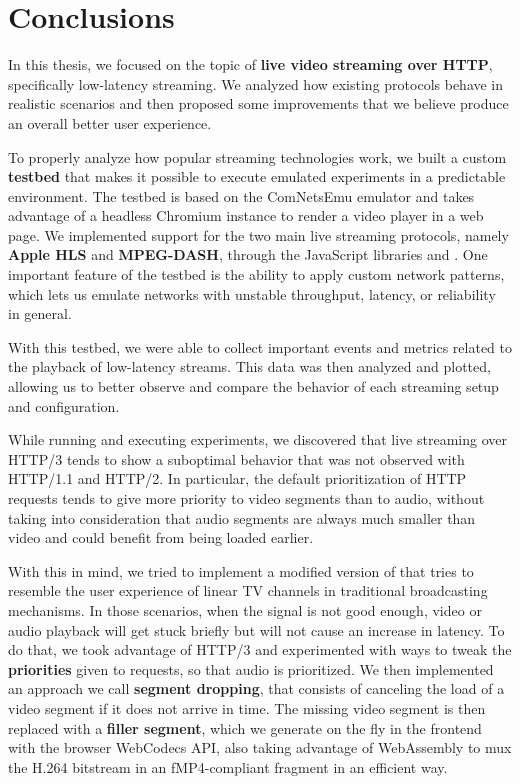 \chapter{Conclusions}
\label{cha:conclusions}

In this thesis, we focused on the topic of \textbf{live video streaming over HTTP}, specifically low-latency streaming. We analyzed how existing protocols behave in realistic scenarios and then proposed some improvements that we believe produce an overall better user experience.

To properly analyze how popular streaming technologies work, we built a custom \textbf{testbed} that makes it possible to execute emulated experiments in a predictable environment. The testbed is based on the ComNetsEmu emulator and takes advantage of a headless Chromium instance to render a video player in a web page. We implemented support for the two main live streaming protocols, namely \textbf{Apple HLS} and \textbf{MPEG-DASH}, through the JavaScript libraries \hlsjs{} and \dashjs{}. One important feature of the testbed is the ability to apply custom network patterns, which lets us emulate networks with unstable throughput, latency, or reliability in general.

With this testbed, we were able to collect important events and metrics related to the playback of low-latency streams. This data was then analyzed and plotted, allowing us to better observe and compare the behavior of each streaming setup and configuration.

While running and executing experiments, we discovered that live streaming over HTTP/3 tends to show a suboptimal behavior that was not observed with HTTP/1.1 and HTTP/2. In particular, the default prioritization of HTTP requests tends to give more priority to video segments than to audio, without taking into consideration that audio segments are always much smaller than video and could benefit from being loaded earlier.

With this in mind, we tried to implement a modified version of \hlsjs{} that tries to resemble the user experience of linear TV channels in traditional broadcasting mechanisms. In those scenarios, when the signal is not good enough, video or audio playback will get stuck briefly but will not cause an increase in latency. To do that, we took advantage of HTTP/3 and experimented with ways to tweak the \textbf{priorities} given to requests, so that audio is prioritized. We then implemented an approach we call \textbf{segment dropping}, that consists of canceling the load of a video segment if it does not arrive in time. The missing video segment is then replaced with a \textbf{filler segment}, which we generate on the fly in the frontend with the browser WebCodecs API, also taking advantage of WebAssembly to mux the H.264 bitstream in an fMP4-compliant fragment in an efficient way.

